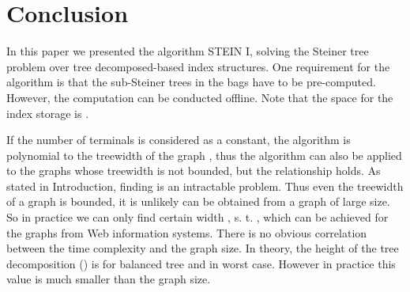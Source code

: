 \documentclass[preprint,12pt]{elsarticle}
\begin{document}
\section{Conclusion}

In this paper we presented the algorithm STEIN I, solving the Steiner tree problem over tree decomposed-based index structures.
One requirement for the algorithm is that the sub-Steiner trees in the bags have to be pre-computed. 
However, the computation can be conducted offline. Note that the space for the index storage is . 

If the number of terminals is considered as a constant, the algorithm is polynomial to the treewidth of the graph ,
thus the algorithm can also be applied to the graphs whose treewidth is not bounded, but the relationship  holds.
As stated in Introduction, finding  is an intractable problem. Thus even the treewidth of a graph is bounded, 
it is unlikely  can be obtained from a graph of large size. So in practice we can only find certain width , s. t. ,
which can be achieved for the graphs from Web information systems.
There is no obvious correlation between the time complexity and the graph size. In theory, the height of the  tree decomposition ()
is  for balanced tree and  in worst case. However in practice this value is much smaller than the graph size.



\end{document}
